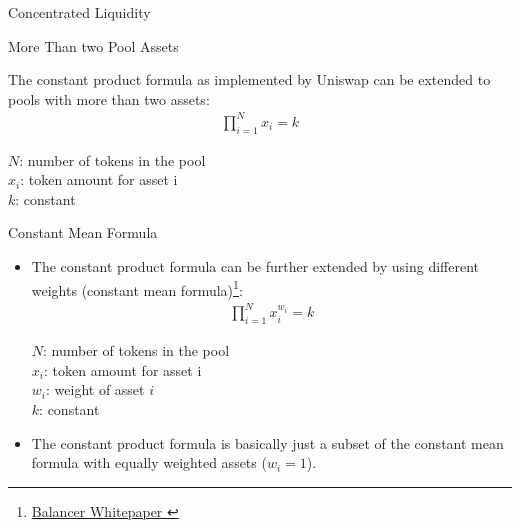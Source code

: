 \documentclass[]{beamer}
\begin{document}
\begin{frame}{Concentrated Liquidity}
	\begin{figure}[h!]
		\begin{center}
			
		\end{center}
	\end{figure}	
\end{frame}


\begin{frame}{More Than two Pool Assets}

The constant product formula as implemented by Uniswap can be extended to pools with more than two assets:
		\begin{align*}
			\prod_{i=1}^N x_i= k
		\end{align*}
		
$N$: number of tokens in the pool\\
$x_i$: token amount for asset i\\
$k$: constant

\end{frame}


\begin{frame}{Constant Mean Formula}
\begin{itemize}
	\item The constant product formula can be further extended by using different weights (constant mean formula)\footnote{\href{https://balancer.fi/whitepaper.pdf}{Balancer Whitepaper \link}}:
		\begin{align*}
			\prod_{i=1}^N x_i^{w_i}= k
		\end{align*}

		$N$: number of tokens in the pool\\
		$x_i$: token amount for asset i\\
		$w_i$: weight of asset $i$\\
		$k$: constant
		\vspace{0.5cm}
	\item The constant product formula is basically just a subset of the constant mean formula with equally weighted assets ($w_i = 1$).
\end{itemize}

\end{frame}
\end{document}
